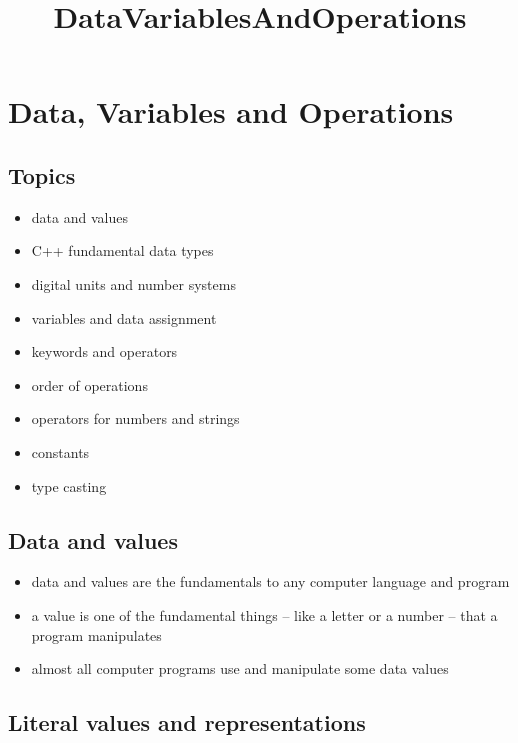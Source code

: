 \documentclass[11pt]{article}
\title{DataVariablesAndOperations}
\providecommand{\tightlist}{%
      \setlength{\itemsep}{0pt}\setlength{\parskip}{0pt}}
\begin{document}
    
    \maketitle
    
    

    
    \hypertarget{data-variables-and-operations}{%
\section{Data, Variables and
Operations}\label{data-variables-and-operations}}

\hypertarget{topics}{%
\subsection{Topics}\label{topics}}

\begin{itemize}
\tightlist
\item
  data and values
\item
  C++ fundamental data types
\item
  digital units and number systems
\item
  variables and data assignment
\item
  keywords and operators
\item
  order of operations
\item
  operators for numbers and strings
\item
  constants
\item
  type casting
\end{itemize}

    \hypertarget{data-and-values}{%
\subsection{Data and values}\label{data-and-values}}

\begin{itemize}
\tightlist
\item
  data and values are the fundamentals to any computer language and
  program
\item
  a value is one of the fundamental things -- like a letter or a number
  -- that a program manipulates
\item
  almost all computer programs use and manipulate some data values
\end{itemize}

\hypertarget{literal-values-and-representations}{%
\subsection{Literal values and
representations}\label{literal-values-and-representations}}
\end{document}
